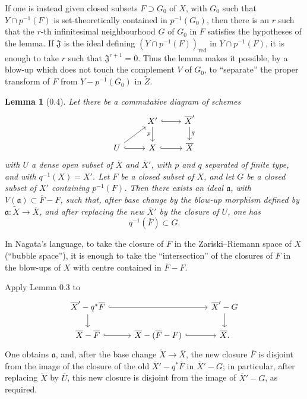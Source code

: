 \documentclass[10pt,a4paper]{article}
\newcommand{\red}{\mathrm{red}}
\theoremstyle{deligne}
\newtheorem*{lemma*}{Lemma}
\newcommand{\heading}[1]{\vspace{0.65em}\noindent{\bfseries #1}\quad}
\begin{document}
\heading{Remark.}
If one is instead given closed subsets \(F\supset G_0\) of \(X\), with \(G_0\) such that \(Y\cap p^{-1}(F)\) is set-theoretically contained in \(p^{-1}(G_0)\), then there is an \(r\) such that the \(r\)-th infinitesimal neighbourhood \(G\) of \(G_0\) in \(F\) satisfies the hypotheses of the lemma. If \(\mathfrak J\) is the ideal defining \((Y\cap p^{-1}(F))_{\red}\) in \(Y\cap p^{-1}(F)\), it is enough to take \(r\) such that \(\mathfrak J^{r+1}=0\). Thus the lemma makes it possible, by a blow-up which does not touch the complement \(V\) of \(G_0\), to ``separate'' the proper transform of \(F\) from \(\overline{Y-p^{-1}(G_0)}\) in \(\widetilde Z\).

\begin{lemma*}[0.4]
Let there be a commutative diagram of schemes
\[
\begin{tikzcd}[column sep=2.4em,row sep=1.6em]
& X' \arrow[r,hook] \arrow[d,"p"'] & \overline{X}' \arrow[d,"q"] \\
U \arrow[ur] \arrow[r,hook] & X \arrow[r,hook] & \overline X
\end{tikzcd}
\]
with \(U\) a dense open subset of \(\overline X\) and \(\overline X'\), with \(p\) and \(q\) separated of finite type, and with \(q^{-1}(X)=X'\). Let \(F\) be a closed subset of \(X\), and let \(G\) be a closed subset of \(\overline X'\) containing \(p^{-1}(F)\). Then there exists an ideal \(\mathfrak a\), with \(V(\mathfrak a)\subset\overline F-F\), such that, after base change by the blow-up morphism defined by \(\mathfrak a:\widetilde X\to\overline X\), and after replacing the new \(\overline X'\) by the closure of \(U\), one has
\[
q^{-1}(\overline F)\subset G.
\]
\end{lemma*}
In Nagata's language, to take the closure of \(F\) in the Zariski--Riemann space of \(X\) (``bubble space''), it is enough to take the ``intersection'' of the closures of \(F\) in the blow-ups of \(X\) with centre contained in \(\overline F-F\).

Apply Lemma 0.3 to
\[
\begin{tikzcd}[column sep=2.7em,row sep=1.6em]
\overline X'-q^*\overline F \arrow[rr,hook] \arrow[d] && \overline X'-G \arrow[d] \\
\overline X-\overline F \arrow[r,hook] & \overline X-(\overline F-F) \arrow[r,hook] & \overline X .
\end{tikzcd}
\]
One obtains \(\mathfrak a\), and, after the base change \(\widetilde X\to\overline X\), the new closure \(\overline F\) is disjoint from the image of the closure of the old \(\overline X'-q^*\overline F\) in \(\overline X'-G\); in particular, after replacing \(\widetilde X\) by \(\overline U\), this new closure is disjoint from the image of \(\overline X'-G\), as required.
\end{document}
